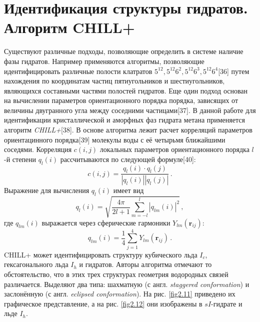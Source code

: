 \section{Идентификация структуры гидратов. Алгоритм CHILL+}
Существуют различные подходы, позволяющие определить в системе наличие фазы гидратов. Например применяются алгоритмы, позволяющие идентифицировать различные полости клатратов $5^{12}, 5^{12}6^2, 5^{12}6^3, 5^{12}6^4$[36] путем нахождения по координатам частиц пятиугольников и шестиугольников, являющихся составными частями полостей гидратов. Еще один подход основан на вычислении параметров ориентационного порядка порядка, зависящих от величины двугранного угла между соседними частицами[37]. В данной работе для идентификации кристаллической и аморфных фаз гидрата метана применяется алгоритм \textit{CHILL+}[38]. В основе алгоритма лежит расчет корреляций параметров ориентацинного порядка[39] молекулы воды с её четырьмя ближайшими соседями. Корреляция $c(i,j)$ локальных параметров ориентационного порядка $l$-й степени  $q_{l}(i)$ рассчитываются по следующей формуле[40]:
\begin{equation}
    c(i,j) = \dfrac{q_l(i)\cdot q_l(j)}{|q_l(i)||q_l(j)|}\,.
    \label{eq2.16}
\end{equation}
Выражение для вычисления $q_{l}(i)$ имеет вид
\begin{equation}
    q_l(i)=\sqrt{\dfrac{4\pi}{2l+1}\sum\limits_{m=-l}^l{|q_{lm}(i)|}^2}\,,
    \label{eq2.17}
\end{equation}
где $q_{lm}(i)$ выражается через сферические гармоники $Y_{lm}(\mathbf{r}_{ij})$:
\begin{equation}
    q_{lm}(i) = \dfrac{1}{4}\sum\limits_{j=1}^4{Y_{lm}(\mathbf{r}_{ij})}\,.
    \label{eq2.18}
\end{equation}
CHILL+ может идентифицировать структуру кубического льда $I_c$, гексагонального льда $I_h$ и гидратов. Авторы алгоритма отмечают то обстоятельство, что в этих трех структурах геометрия водородных связей различается. Выделяют два типа: шахматную (с англ. \textit{staggered conformation}) и заслонённую (с англ. \textit{eclipsed conformation}). На рис. \ref{fig2.11} приведено их графическое представление, а на рис. \ref{fig2.12} они изображены в $sI$-гидрате и льде $I_h$.

